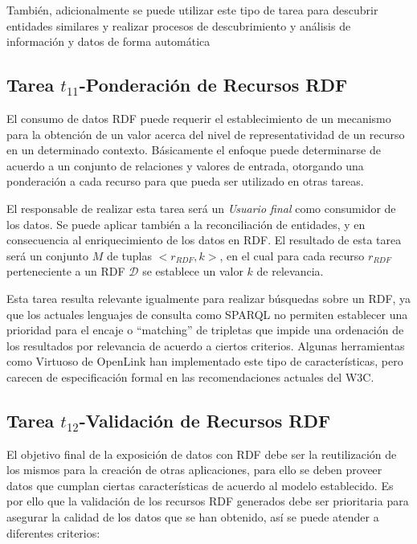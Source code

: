 También, adicionalmente se puede utilizar este tipo de tarea para descubrir entidades similares
y realizar procesos de descubrimiento y análisis de información y datos de forma automática

\subsection{Tarea $t_{11}$-Ponderación de Recursos RDF}
El consumo de datos \gls{RDF} puede requerir el establecimiento de un mecanismo para la obtención de 
un valor acerca del nivel de representatividad de un recurso en un determinado contexto. Básicamente
el enfoque puede determinarse de acuerdo a un conjunto de relaciones y valores de entrada, otorgando 
una ponderación a cada recurso para que pueda ser utilizado en otras tareas.

El responsable de realizar esta tarea será un \textit{Usuario final} como consumidor
de los datos. Se puede aplicar también a la reconciliación de entidades, y en consecuencia 
al enriquecimiento de los datos en RDF. El resultado de esta tarea será un conjunto $M$ de tuplas $<r_{RDF}, k>$, en el 
cual para cada recurso $r_{RDF}$ perteneciente a un \dataset RDF $\mathcal{D}$ se establece un valor $k$ de relevancia.

Esta tarea resulta relevante igualmente para realizar búsquedas sobre un \dataset RDF, ya que
los actuales lenguajes de consulta como \gls{SPARQL} no permiten establecer una prioridad para
el encaje o ``matching'' de tripletas que impide una ordenación de los resultados por relevancia de acuerdo
a ciertos criterios. Algunas herramientas como Virtuoso de OpenLink han implementado este tipo de características, 
pero carecen de especificación formal en las recomendaciones actuales del W3C.

\subsection{Tarea $t_{12}$-Validación de Recursos RDF}\label{lod-t12}
El objetivo final de la exposición de datos con \gls{RDF} debe ser la reutilización de los mismos
para la creación de otras aplicaciones, para ello se deben proveer datos que cumplan ciertas características de acuerdo al modelo establecido. Es por ello
que la validación de los recursos RDF generados debe ser prioritaria para asegurar
la calidad de los datos que se han obtenido, así se puede atender a diferentes criterios:

